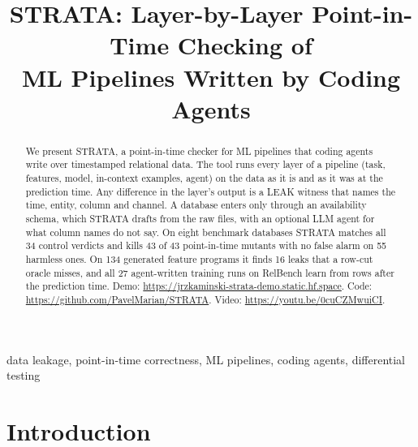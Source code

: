 \documentclass[10pt,conference]{IEEEtran}
\newcommand{\tool}{STRATA}
\begin{document}
\title{\tool: Layer-by-Layer Point-in-Time Checking of\\ML Pipelines Written by Coding Agents}

\author{
}

\maketitle

\begin{abstract}
We present \tool, a point-in-time checker for ML pipelines that coding
agents write over timestamped relational data. The tool runs
every layer of a pipeline (task, features, model, in-context examples,
agent) on the data as it is and as it was at the prediction time. Any
difference in the layer's output is a LEAK witness that names the
time, entity, column and channel. A database enters only through an
availability schema, which \tool{} drafts from the raw files, with an
optional LLM agent for what column names do not say. On eight benchmark
databases \tool{} matches all 34 control verdicts and kills 43 of 43
point-in-time mutants with no false alarm on 55 harmless ones. On 134
generated feature programs it finds 16 leaks that a row-cut oracle misses,
and all 27 agent-written training runs on RelBench learn from rows after the
prediction time.
Demo: \url{https://jrzkaminski-strata-demo.static.hf.space}.
Code: \url{https://github.com/PavelMarian/STRATA}.
Video: \url{https://youtu.be/0cuCZMwuiCI}.
\end{abstract}

\begin{IEEEkeywords}
data leakage, point-in-time correctness, ML pipelines, coding agents, differential testing
\end{IEEEkeywords}

\section{Introduction}
\end{document}

